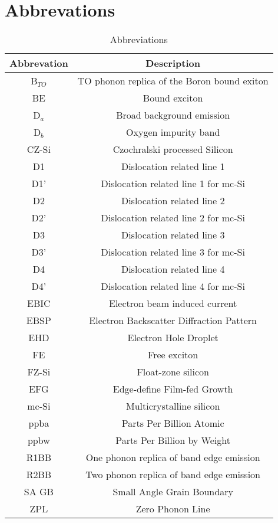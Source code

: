 		\section{Abbrevations}
		
		\begin{table}[H]
\centering
\begin{tabular}{|c|c|}
\hline

		\textbf{Abbrevation} & \textbf{Description} \\ \hline
		B$_{TO}$ & TO phonon replica of the Boron bound exiton  \\ \hline
		BE & Bound exciton \\ \hline
		D$_a$ & Broad background emission  \\ \hline
		D$_b$ & Oxygen impurity band  \\ \hline
		CZ-Si & Czochralski processed Silicon \\ \hline
		D1	& Dislocation related line 1  \\ \hline
		D1' & Dislocation related line 1 for mc-Si  \\ \hline
		D2	& Dislocation related line 2 \\ \hline
		D2' & Dislocation related line 2 for mc-Si  \\ \hline
		D3	& Dislocation related line 3  \\ \hline
		D3' & Dislocation related line 3 for mc-Si  \\ \hline
		D4	& Dislocation related line 4  \\ \hline
		D4' & Dislocation related line 4 for mc-Si  \\ \hline
		EBIC & Electron beam induced current \\ \hline
		EBSP & Electron Backscatter Diffraction Pattern \\ \hline
		EHD & Electron Hole Droplet	\\ \hline
		FE & Free exciton \\ \hline
		FZ-Si & Float-zone silicon \\ \hline
		EFG & Edge-define Film-fed Growth \\ \hline
		mc-Si & Multicrystalline silicon \\ \hline
		ppba & Parts Per Billion Atomic \\ \hline
		ppbw & Parts Per Billion by Weight \\ \hline
		R1BB & One phonon replica of band edge emission \\ \hline
		R2BB & Two phonon replica of band edge emission \\ \hline
		SA GB & Small Angle Grain Boundary \\ \hline
		ZPL & Zero Phonon Line \\ \hline

		\end{tabular}
\caption{Abbreviations}
\label{abbreviations}
\end{table}
		
		
